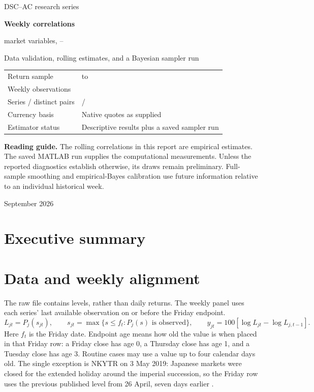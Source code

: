 \documentclass[11pt,a4paper]{article}
\begin{document}
\begin{titlepage}
{\color{navy}\Large DSC--AC research series\par}
\vspace{25mm}
{\color{navy}\Huge\bfseries Weekly correlations\par}
\vspace{5mm}
{\Large \NumVariables{} market variables, \FirstReturn{}--\LastReturn{}\par}
\vspace{10mm}
{\large Data validation, rolling estimates, and a Bayesian sampler run\par}
\vspace{18mm}
\begin{tabular}{@{}ll@{}}\toprule
Return sample & \FirstReturn{} to \LastReturn{}\\
Weekly observations & \NumReturns{}\\
Series / distinct pairs & \NumVariables{} / \NumPairs{}\\
Currency basis & Native quotes as supplied\\
Estimator status & Descriptive results plus a saved sampler run\\\bottomrule
\end{tabular}
\vfill
\textbf{Reading guide.} The rolling correlations in this report are empirical estimates. The saved MATLAB run supplies the computational measurements. Unless the reported diagnostics establish otherwise, its draws remain preliminary. Full-sample smoothing and empirical-Bayes calibration use future information relative to an individual historical week.
\vspace{10mm}
\par September 2026
\end{titlepage}
\section*{Executive summary}


{\small\setlength{\parskip}{0pt}\tableofcontents}
\clearpage
\section{Data and weekly alignment}
The raw file contains levels, rather than daily returns. The weekly panel uses each series' last available observation on or before the Friday endpoint.
\begin{equation}
L_{jt}=P_j(s_{jt}),\qquad s_{jt}=\max\{s\leq f_t:P_j(s)\text{ is observed}\},\qquad
y_{jt}=100\left[\log L_{jt}-\log L_{j,t-1}\right].
\end{equation}
Here $f_t$ is the Friday date. Endpoint age means how old the value is when placed in that Friday row: a Friday close has age 0, a Thursday close has age 1, and a Tuesday close has age 3. Routine cases may use a value up to four calendar days old. The single exception is NKYTR on 3 May 2019: Japanese markets were closed for the extended holiday around the imperial succession, so the Friday row uses the previous published level from 26 April, seven days earlier \citep{jpx2019}.
\end{document}
